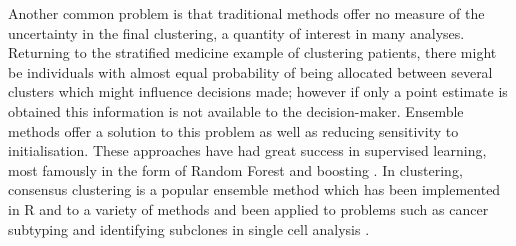 \documentclass{bmcart}
\begin{document}
Another common problem is that traditional methods offer no measure of the uncertainty in the final clustering, a quantity of interest in many analyses. Returning to the stratified medicine example of clustering patients, there might be individuals with almost equal probability of being allocated between several clusters which might influence decisions made; however if only a point estimate is obtained this information is not available to the decision-maker. 
Ensemble methods offer a solution to this problem as well as reducing sensitivity to initialisation. These approaches have had great success in supervised learning, most famously in the form of Random Forest \citep{breiman2001random} and boosting \citep{friedman2002stochastic}. In clustering, consensus clustering \citep{monti2003consensus} is a popular ensemble method which has been implemented in R \citep{wilkerson2010consensusclusterplus} and to a variety of methods \citep{john2020m3c, gu2020cola} and been applied to problems such as cancer subtyping \citep{lehmann2011identification, verhaak2010integrated} and identifying subclones in single cell analysis \citep{kiselev2017sc3}.



\end{document}
